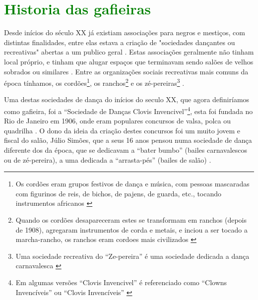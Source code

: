 
\section{\textcolor{green}{Historia das gafieiras}}

Desde inícios do século XX já existiam associações para negros e mestiços, 
com distintas  finalidades, entre elas estava a criação de 
"sociedades dançantes ou recreativas" abertas a um publico geral
\cite[pp. 154-155]{neres1999negro} \cite[pp. 71]{de2008bexiga} \cite[pp. 11]{respeitojournalbrasil1}.
Estas associações geralmente não tinham local próprio, 
e tinham que alugar espaços que terminavam sendo salões de velhos sobrados
ou similares \cite[pp. 154-155]{neres1999negro} \cite[pp. 49]{diniz2003almanaque}.
Entre as organizações sociais recreativas mais comuns da época tínhamos, 
os cordões\footnote{Os cordões eram grupos festivos de dança e música, 
com pessoas mascaradas com figurinos de reis, de
bichos, de pajens, de guarda, etc., tocando instrumentos africanos \cite[pp. 23-24]{fernandes2001escolas}},
os ranchos\footnote{Quando os cordões desapareceram estes se transformam em ranchos (depois de 1908), 
agregaram instrumentos de corda e metais, e inciou a ser tocado a marcha-rancho,
os ranchos eram cordoes mais civilizados \cite[pp. 24]{fernandes2001escolas}} 
e os zé-pereiras\footnote{ Uma sociedade recreativa do ``Ze-pereira''
é uma sociedade dedicada a dança carnavalesca \cite[pp. 10]{simoesjournalbrasil1}} 
\cite[pp. 10]{simoesjournalbrasil1}.


Uma destas sociedades de dança do inícios do seculo XX, que agora definiríamos como gafieira, 
foi a ``Sociedade de Danças Clovis Invencivel''\footnote{Em algumas versões 
``Clovis Invencivel'' é referenciado como ``Clowns Invencíveis'' \cite[pp. 3]{juliosimoes} ou 
``Clovis Invencíveis'' \cite[pp. 10]{simoesjournalbrasil1}}, 
esta foi fundada no Rio de Janeiro em 1906, 
onde eram populares concursos de valsa, polca ou quadrilha \cite[pp. 3]{entrevistajuliojournalbrasil1}.
O dono da ideia da criação destes concursos foi um muito jovem e fiscal do salão, Júlio Simões,
que a seus 16 anos pensou numa sociedade de dança diferente dos da época,
que se dedicavam a ``bater bumbo'' (bailes carnavalescos ou de zé-pereira), 
a uma dedicada a ``arrasta-pés'' (bailes de salão) \cite[pp. 3]{entrevistajuliojournalbrasil1} \cite[pp. 3]{juliosimoes} \cite[pp. 10]{simoesjournalbrasil1}.

